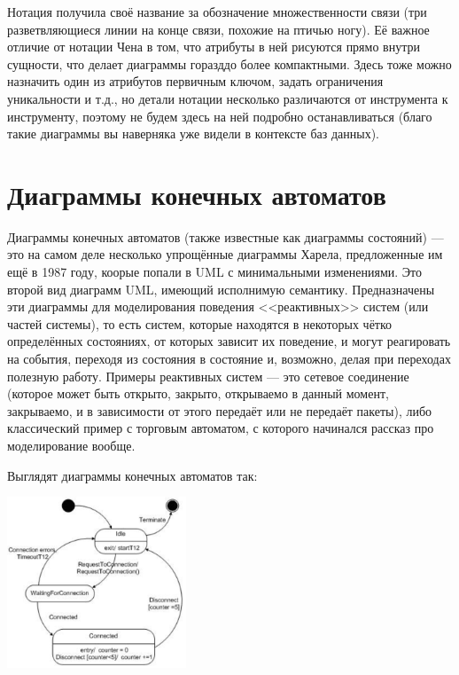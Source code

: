 \documentclass[a5paper]{article}
\begin{document}
Нотация получила своё название за обозначение множественности связи (три разветвляющиеся линии на конце связи, похожие на птичью ногу). Её важное отличие от нотации Чена в том, что атрибуты в ней рисуются прямо внутри сущности, что делает диаграммы горазддо более компактными. Здесь тоже можно назначить один из атрибутов первичным ключом, задать ограничения уникальности и т.д., но детали нотации несколько различаются от инструмента к инструменту, поэтому не будем здесь на ней подробно останавливаться (благо такие диаграммы вы наверняка уже видели в контексте баз данных).

\section{Диаграммы конечных автоматов}

Диаграммы конечных автоматов (также известные как диаграммы состояний) --- это на самом деле несколько упрощённые диаграммы Харела, предложенные им ещё в 1987 году, коорые попали в UML с минимальными изменениями. Это второй вид диаграмм UML, имеющий исполнимую семантику. Предназначены эти диаграммы для моделирования поведения <<реактивных>> систем (или частей системы), то есть систем, которые находятся в некоторых чётко определённых состояниях, от которых зависит их поведение, и могут реагировать на события, переходя из состояния в состояние и, возможно, делая при переходах полезную работу. Примеры реактивных систем --- это сетевое соединение (которое может быть открыто, закрыто, открываемо в данный момент, закрываемо, и в зависимости от этого передаёт или не передаёт пакеты), либо классический пример с торговым автоматом, с которого начинался рассказ про моделирование вообще.

Выглядят диаграммы конечных автоматов так:

\begin{center}
	\includegraphics[width=0.4\textwidth]{stateTransitionExample.png}
\end{center}
\end{document}
